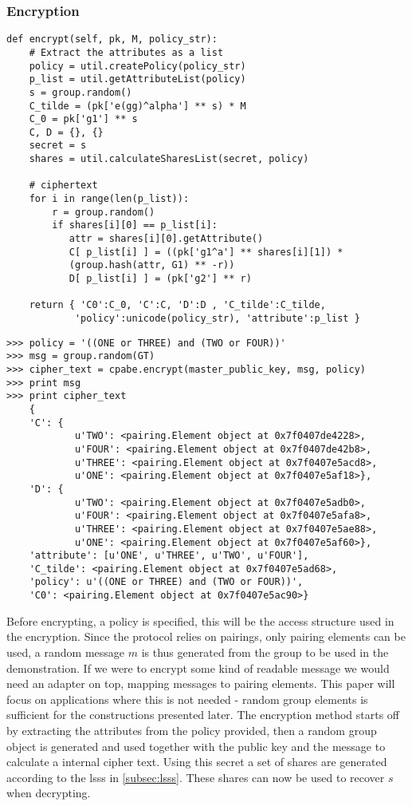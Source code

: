 \subsubsection{Encryption}
\begin{verbatim}
def encrypt(self, pk, M, policy_str):
    # Extract the attributes as a list
    policy = util.createPolicy(policy_str)        
    p_list = util.getAttributeList(policy)
    s = group.random()
    C_tilde = (pk['e(gg)^alpha'] ** s) * M
    C_0 = pk['g1'] ** s
    C, D = {}, {}
    secret = s
    shares = util.calculateSharesList(secret, policy)

    # ciphertext
    for i in range(len(p_list)):
        r = group.random()
        if shares[i][0] == p_list[i]:
           attr = shares[i][0].getAttribute() 
           C[ p_list[i] ] = ((pk['g1^a'] ** shares[i][1]) *
           (group.hash(attr, G1) ** -r))
           D[ p_list[i] ] = (pk['g2'] ** r)
    
    return { 'C0':C_0, 'C':C, 'D':D , 'C_tilde':C_tilde, 
            'policy':unicode(policy_str), 'attribute':p_list }

\end{verbatim}

\begin{lstlisting}
>>> policy = '((ONE or THREE) and (TWO or FOUR))'
>>> msg = group.random(GT)
>>> cipher_text = cpabe.encrypt(master_public_key, msg, policy)
>>> print msg
>>> print cipher_text
    {
    'C': {
            u'TWO': <pairing.Element object at 0x7f0407de4228>, 
            u'FOUR': <pairing.Element object at 0x7f0407de42b8>, 
            u'THREE': <pairing.Element object at 0x7f0407e5acd8>, 
            u'ONE': <pairing.Element object at 0x7f0407e5af18>}, 
    'D': {
            u'TWO': <pairing.Element object at 0x7f0407e5adb0>, 
            u'FOUR': <pairing.Element object at 0x7f0407e5afa8>, 
            u'THREE': <pairing.Element object at 0x7f0407e5ae88>, 
            u'ONE': <pairing.Element object at 0x7f0407e5af60>}, 
    'attribute': [u'ONE', u'THREE', u'TWO', u'FOUR'], 
    'C_tilde': <pairing.Element object at 0x7f0407e5ad68>, 
    'policy': u'((ONE or THREE) and (TWO or FOUR))', 
    'C0': <pairing.Element object at 0x7f0407e5ac90>}
\end{lstlisting}   

Before encrypting, a policy is specified, this will be the access structure used in the encryption. Since the protocol relies on pairings, only pairing elements can be used, a random message $m$ is thus generated from the group to be used in the demonstration. If we were to encrypt some kind of readable message we would need an adapter on top, mapping messages to pairing elements. This paper will focus on applications where this is not needed - random group elements is sufficient for the constructions presented later. The encryption method starts off by extracting the attributes from the policy provided, then a random group object is generated and used together with the public key and the message to calculate a internal cipher text. Using this secret a set of shares are generated according to the \gls{lsss} in \ref{subsec:lsss}. These shares can now be used to recover $s$ when decrypting.


